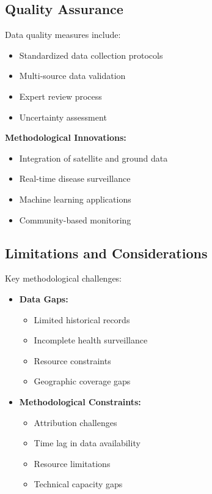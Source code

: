 \subsection{Quality Assurance}
Data quality measures include:

\begin{itemize}
    \item Standardized data collection protocols
    \item Multi-source data validation
    \item Expert review process
    \item Uncertainty assessment
\end{itemize}

\begin{keymessage}
\textbf{Methodological Innovations:}
\begin{itemize}
    \item Integration of satellite and ground data
    \item Real-time disease surveillance
    \item Machine learning applications
    \item Community-based monitoring
\end{itemize}
\end{keymessage}

\subsection{Limitations and Considerations}
Key methodological challenges:

\begin{itemize}
    \item \textbf{Data Gaps:}
    \begin{itemize}
        \item Limited historical records
        \item Incomplete health surveillance
        \item Resource constraints
        \item Geographic coverage gaps
    \end{itemize}
    
    \item \textbf{Methodological Constraints:}
    \begin{itemize}
        \item Attribution challenges
        \item Time lag in data availability
        \item Resource limitations
        \item Technical capacity gaps
    \end{itemize}
\end{itemize}

